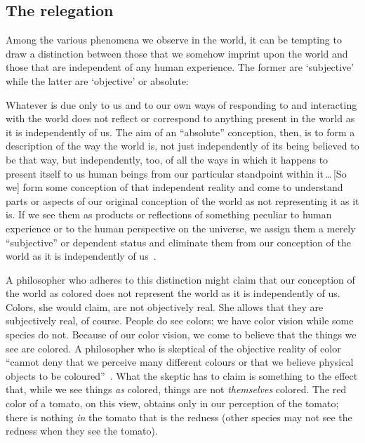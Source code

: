 \documentclass[11pt]{standalone}
\newenvironment{squote}{%
	\begin{spacing}{1}
	\begin{list}{}{%
	\setlength{\labelwidth}{0pt}%
	\rightmargin\leftmargin%
	}
	\item\relax
	}{%
	\end{list}%
	\end{spacing}
	}
\begin{document}
\begin{spacing}{1.5}
\subsection{The relegation}
\label{relegate}
Among the various phenomena we observe in the world, it can be
tempting to draw a distinction between those that we somehow imprint
upon the world and those that are independent of any human experience.
The former are `subjective' while the latter are `objective' or
absolute:
\begin{squote}
Whatever is due only to us and to our own ways of responding to and
interacting with the world does not reflect or correspond to anything
present in the world as it is independently of us.  The aim of an
``absolute'' conception, then, is to form a description of the way the
world is, not just independently of its being believed to be that way,
but independently, too, of all the ways in which it happens to present
itself to us human beings from our particular standpoint within
it\,\ldots\,[So we] form some conception of that independent reality
and come to understand parts or aspects of our original conception of
the world as not representing it as it is.  If we see them as products
or reflections of something peculiar to human experience or to the
human perspective on the universe, we assign them a merely
``subjective'' or dependent status and eliminate them from our
conception of the world as it is independently of
us~\citep[30--31]{stroud2000a}.
\end{squote}

A philosopher who adheres to this distinction might claim that our
conception of the world as colored does not represent the world as it
is independently of us.  Colors, she would claim, are not objectively
real.  She allows that they are subjectively real, of course.  People
do see colors; we have color vision while some species do not.
Because of our color vision, we come to believe that the things we see
are colored.  A philosopher who is skeptical of the objective reality
of color ``cannot deny that we perceive many different colours or that
we believe physical objects to be coloured''~\citep[145]{stroud2000a}.
What the skeptic has to claim is something to the effect that, while
we see things {\em as} colored, things are not {\em themselves}
colored.  The red color of a tomato, on this view, obtains only in our
perception of the tomato; there is nothing {\em in} the tomato that
is the redness (other species may not see the redness when they see
the tomato).
%


\end{spacing}
\end{document}
